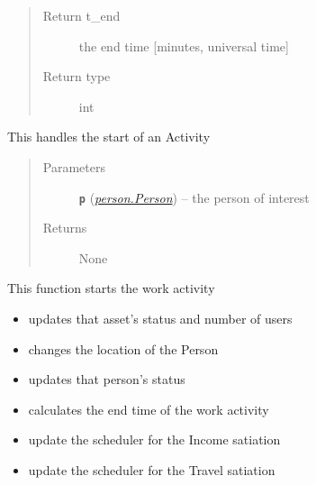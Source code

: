 \documentclass[letterpaper,10pt,english]{sphinxmanual}
\begin{document}
\begin{fulllineitems}
\begin{fulllineitems}
\begin{quote}
\begin{description}
\item[{Return t\_end}] \leavevmode
the end time {[}minutes, universal time{]}

\item[{Return type}] \leavevmode
int

\end{description}\end{quote}

\end{fulllineitems}


\begin{fulllineitems}
\label{work:work.Work.start}
This handles the start of an Activity
\begin{quote}\begin{description}
\item[{Parameters}] \leavevmode
\textbf{\texttt{p}} ({\hyperref[person:person.Person]{\emph{\emph{person.Person}}}}) -- the person of interest

\item[{Returns}] \leavevmode
None

\end{description}\end{quote}

\end{fulllineitems}


\begin{fulllineitems}
\label{work:work.Work.start_work}
This function starts the work activity
\begin{itemize}
\item {} 
updates that asset's status and number of users

\item {} 
changes the location of the Person

\item {} 
updates that person's status

\item {} 
calculates the end time of the work activity

\item {} 
update the scheduler for the Income satiation

\item {} 
update the scheduler for the Travel satiation


\end{itemize}
\end{fulllineitems}
\end{fulllineitems}
\end{document}

